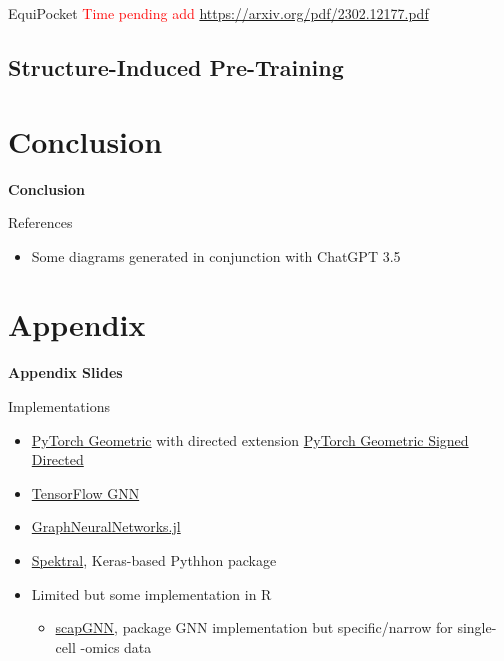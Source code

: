 \documentclass{beamer}
\begin{document}
\begin{frame}{EquiPocket}
    \textcolor{red}{Time pending add} 
    \url{https://arxiv.org/pdf/2302.12177.pdf}
\end{frame}

\subsection{Structure-Induced Pre-Training}


\section*{Conclusion}

\begin{frame}{}
    \bf{\LARGE Conclusion}    
\end{frame}



\begin{frame}[allowframebreaks]{References}
    \begin{itemize}
    \item Some diagrams generated in conjunction with ChatGPT 3.5
    \end{itemize}
    \printbibliography 
\end{frame}



\section*{Appendix}

\begin{frame}{}
\bf{\LARGE Appendix Slides}    
\end{frame}

\begin{frame}{Implementations}
    \begin{itemize}
        \item \href{https://pytorch-geometric.readthedocs.io/en/latest/}{PyTorch Geometric} with directed extension \href{https://github.com/SherylHYX/pytorch_geometric_signed_directed}{PyTorch Geometric Signed Directed}
        \item \href{https://github.com/tensorflow/gnn}{TensorFlow GNN} \cite{ferludin_tf-gnn_2023}
        \item \href{https://carlolucibello.github.io/GraphNeuralNetworks.jl/dev/}{GraphNeuralNetworks.jl}
        \item \href{https://graphneural.network/}{Spektral}, Keras-based Pythhon package 
        \item Limited but some implementation in R 
        \begin{itemize}
            \item \href{https://cran.r-project.org/web/packages/scapGNN/vignettes/vignette.html}{scapGNN}, package GNN implementation but specific/narrow for single-cell -omics data 
        \end{itemize}
    \end{itemize}
\end{frame}
\end{document}
